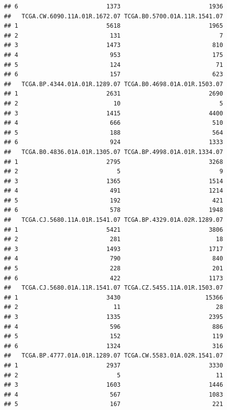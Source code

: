 \documentclass[
]{article}
\begin{document}
\begin{verbatim}
## 6                         1373                         1936
##   TCGA.CW.6090.11A.01R.1672.07 TCGA.B0.5700.01A.11R.1541.07
## 1                         5618                         1965
## 2                          131                            7
## 3                         1473                          810
## 4                          953                          175
## 5                          124                           71
## 6                          157                          623
##   TCGA.BP.4344.01A.01R.1289.07 TCGA.B0.4698.01A.01R.1503.07
## 1                         2631                         2690
## 2                           10                            5
## 3                         1415                         4400
## 4                          666                          510
## 5                          188                          564
## 6                          924                         1333
##   TCGA.B0.4836.01A.01R.1305.07 TCGA.BP.4998.01A.01R.1334.07
## 1                         2795                         3268
## 2                            5                            9
## 3                         1365                         1514
## 4                          491                         1214
## 5                          192                          421
## 6                          578                         1948
##   TCGA.CJ.5680.11A.01R.1541.07 TCGA.BP.4329.01A.02R.1289.07
## 1                         5421                         3806
## 2                          281                           18
## 3                         1493                         1717
## 4                          790                          840
## 5                          228                          201
## 6                          422                         1173
##   TCGA.CJ.5680.01A.11R.1541.07 TCGA.CZ.5455.11A.01R.1503.07
## 1                         3430                        15366
## 2                           11                           28
## 3                         1335                         2395
## 4                          596                          886
## 5                          152                          119
## 6                         1324                          316
##   TCGA.BP.4777.01A.01R.1289.07 TCGA.CW.5583.01A.02R.1541.07
## 1                         2937                         3330
## 2                            5                           11
## 3                         1603                         1446
## 4                          567                         1083
## 5                          167                          221

\end{verbatim}
\end{document}
